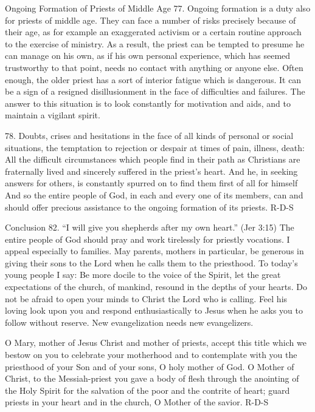 \documentclass[oneside]{book}
\begin{document}
Ongoing Formation of Priests of Middle Age
77. Ongoing formation is a duty also for priests of middle age. They can face a
number of risks precisely because of their age, as for example an exaggerated
activism or a certain routine approach to the exercise of ministry. As a result,
the priest can be tempted to presume he can manage on his own, as if his own
personal experience, which has seemed trustworthy to that point, needs no
contact with anything or anyone else. Often enough, the older priest has a sort
of interior fatigue which is dangerous. It can be a sign of a resigned
disillusionment in the face of difficulties and failures. The answer to this
situation is to look constantly for motivation and aids, and to maintain a
vigilant spirit.

78. Doubts, crises and hesitations in the face of all kinds of personal or
social situations, the temptation to rejection or despair at times of pain,
illness, death: All the difficult circumstances which people find in their path
as Christians are fraternally lived and sincerely suffered in the priest's
heart. And he, in seeking answers for others, is constantly spurred on to find
them first of all for himself And so the entire people of God, in each and every
one of its members, can and should offer precious assistance to the ongoing
formation of its priests.
R-D-S

Conclusion
82. ``I will give you shepherds after my own heart.'' (Jer 3:15) The entire
people of God should pray and work tirelessly for priestly vocations. I appeal
especially to families. May parents, mothers in particular, be generous in
giving their sons to the Lord when he calls them to the priesthood. To today's
young people I say: Be more docile to the voice of the Spirit, let the great
expectations of the church, of mankind, resound in the depths of your hearts. Do
not be afraid to open your minds to Christ the Lord who is calling. Feel his
loving look upon you and respond enthusiastically to Jesus when he asks you to
follow without reserve. New evangelization needs new evangelizers.

O Mary, mother of Jesus Christ and mother of priests, accept this title which we
bestow on you to celebrate your motherhood and to contemplate with you the
priesthood of your Son and of your sons, O holy mother of God. O Mother of
Christ, to the Messiah-priest you gave a body of flesh through the anointing of
the Holy Spirit for the salvation of the poor and the contrite of heart; guard
priests in your heart and in the church, O Mother of the savior.
R-D-S
\end{document}
